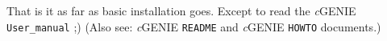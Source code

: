 \documentclass[10pt,twoside]{article}
\begin{document}
That is it as far as basic installation goes. Except to read the \textit{c}GENIE \texttt{User\_manual} ;) (Also see: \textit{c}GENIE \texttt{README} and \textit{c}GENIE \texttt{HOWTO} documents.)

\end{document}
